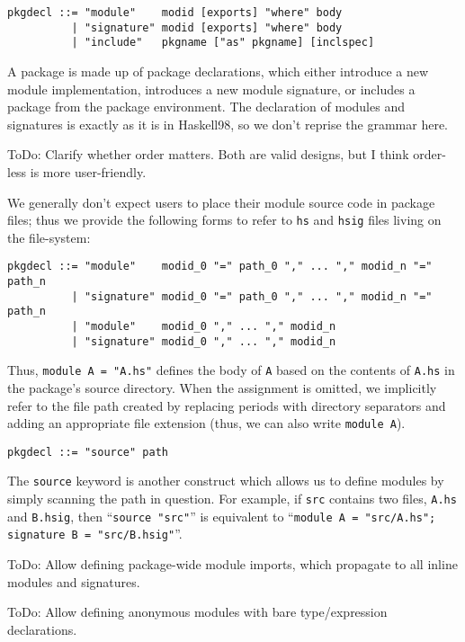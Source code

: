 \documentclass{article}
\newcommand{\Red}[1]{{\color{red} #1}}
\begin{document}
\begin{verbatim}
pkgdecl ::= "module"    modid [exports] "where" body
          | "signature" modid [exports] "where" body
          | "include"   pkgname ["as" pkgname] [inclspec]
\end{verbatim}

A package is made up of package declarations, which either introduce a
new module implementation, introduces a new module
signature, or includes a package from the package environment.
The declaration of modules and signatures is exactly as it is in Haskell98,
so we don't reprise the grammar here.

\Red{ToDo: Clarify whether order matters.  Both are valid designs, but I think order-less is more user-friendly.}

We generally don't expect users to place their module source code
in package files; thus we provide the following forms to refer to
\verb|hs| and \verb|hsig| files living on the file-system:

\begin{verbatim}
pkgdecl ::= "module"    modid_0 "=" path_0 "," ... "," modid_n "=" path_n
          | "signature" modid_0 "=" path_0 "," ... "," modid_n "=" path_n
          | "module"    modid_0 "," ... "," modid_n
          | "signature" modid_0 "," ... "," modid_n
\end{verbatim}

Thus, \verb|module A = "A.hs"| defines the body of \verb|A| based
on the contents of \verb|A.hs| in the package's source directory.
When the assignment is omitted, we implicitly refer to the file path
created by replacing periods with directory separators and adding
an appropriate file extension (thus, we can also write \verb|module A|).

\begin{verbatim}
pkgdecl ::= "source" path
\end{verbatim}

The \verb|source| keyword is another construct which allows us to
define modules by simply scanning the path in question.  For example,
if \verb|src| contains two files, \verb|A.hs| and \verb|B.hsig|,
then ``\verb|source "src"|'' is equivalent to
``\verb|module A = "src/A.hs"; signature B = "src/B.hsig"|''.

\Red{ToDo: Allow defining package-wide module imports, which propagate to all inline
modules and signatures.}

\Red{ToDo: Allow defining anonymous modules with bare type/expression declarations.}
\end{document}

